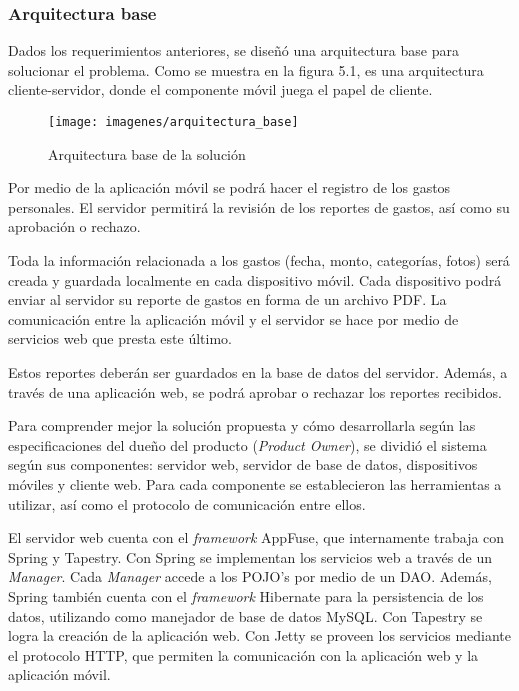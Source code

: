 \subsubsection{Arquitectura base}

Dados los requerimientos anteriores, se diseñó una arquitectura base para solucionar el problema. Como se muestra en la figura 5.1, es una arquitectura cliente-servidor, donde el componente móvil juega el papel de cliente.

\begin{figure}[ht]
  \centering
  \texttt{[image: imagenes/arquitectura\_base]}
  \caption{Arquitectura base de la solución}
  \label{fig:arquitecturaBase}
\end{figure}

Por medio de la aplicación móvil se podrá hacer el registro de los gastos personales. El servidor permitirá la revisión de los reportes de gastos, así como su aprobación o rechazo.

Toda la información relacionada a los gastos (fecha, monto, categorías, fotos) será creada y guardada localmente en cada dispositivo móvil. Cada dispositivo podrá enviar al servidor su reporte de gastos en forma de un archivo PDF. La comunicación entre la aplicación móvil y el servidor se hace por medio de servicios web que presta este último.

Estos reportes deberán ser guardados en la base de datos del servidor. Además, a través de una aplicación web, se podrá aprobar o rechazar los reportes recibidos.


Para comprender mejor la solución propuesta y cómo desarrollarla según las especificaciones del dueño del producto (\textit{Product Owner}), se dividió el sistema según sus componentes: servidor web, servidor de base de datos, dispositivos móviles y cliente web. Para cada componente se establecieron las herramientas a utilizar, así como el protocolo de comunicación entre ellos. 

El servidor web cuenta con el \textit{framework} AppFuse, que internamente trabaja con Spring y Tapestry. Con Spring se implementan los servicios web a través de un \textit{Manager}. Cada \textit{Manager} accede a los POJO's por medio de un DAO. Además, Spring también cuenta con el \textit{framework} Hibernate para la persistencia de los datos, utilizando como manejador de base de datos MySQL. Con Tapestry se logra la creación de la aplicación web. Con Jetty se proveen los servicios mediante el protocolo HTTP, que permiten la comunicación con la aplicación web y la aplicación móvil.

